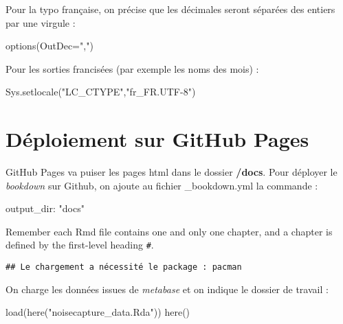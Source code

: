 \documentclass[
]{book}
\newenvironment{Shaded}{\begin{snugshade}}{\end{snugshade}}
\newcommand{\AttributeTok}[1]{\textcolor[rgb]{0.77,0.63,0.00}{#1}}
\newcommand{\FunctionTok}[1]{\textcolor[rgb]{0.00,0.00,0.00}{#1}}
\newcommand{\NormalTok}[1]{#1}
\newcommand{\SpecialCharTok}[1]{\textcolor[rgb]{0.00,0.00,0.00}{#1}}
\newcommand{\StringTok}[1]{\textcolor[rgb]{0.31,0.60,0.02}{#1}}
\begin{document}
Pour la typo française, on précise que les décimales seront séparées des entiers par une virgule :

\begin{Shaded}
\begin{Highlighting}[]
\FunctionTok{options}\NormalTok{(}\AttributeTok{OutDec=}\StringTok{","}\NormalTok{)}
\end{Highlighting}
\end{Shaded}

Pour les sorties francisées (par exemple les noms des mois) :

\begin{Shaded}
\begin{Highlighting}[]
\FunctionTok{Sys.setlocale}\NormalTok{(}\StringTok{"LC\_CTYPE"}\NormalTok{,}\StringTok{"fr\_FR.UTF{-}8"}\NormalTok{)}
\end{Highlighting}
\end{Shaded}

\hypertarget{duxe9ploiement-sur-github-pages}{%
\section{Déploiement sur GitHub Pages}\label{duxe9ploiement-sur-github-pages}}

GitHub Pages va puiser les pages html dans le dossier \textbf{/docs}. Pour déployer le \emph{bookdown} sur Github, on ajoute au fichier \_bookdown.yml la commande :

\begin{Shaded}
\begin{Highlighting}[]
\NormalTok{output\_dir}\SpecialCharTok{:} \StringTok{"docs"}
\end{Highlighting}
\end{Shaded}

Remember each Rmd file contains one and only one chapter, and a chapter is defined by the first-level heading \texttt{\#}.

\begin{verbatim}
## Le chargement a nécessité le package : pacman
\end{verbatim}

On charge les données issues de \emph{metabase} et on indique le dossier de travail :

\begin{Shaded}
\begin{Highlighting}[]
\FunctionTok{load}\NormalTok{(}\FunctionTok{here}\NormalTok{(}\StringTok{"noisecapture\_data.Rda"}\NormalTok{))}
\FunctionTok{here}\NormalTok{()}
\end{Highlighting}
\end{Shaded}
\end{document}
